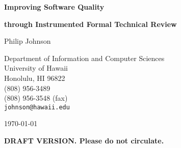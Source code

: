 \begin{titlepage}
\vspace*{1in}
\begin{center}
   
\Large

{\bf Improving Software Quality}   \medskip\par
{\bf through Instrumented Formal Technical Review}  \bigskip\par
                                                    \bigskip\par

\normalsize

Philip Johnson                           \medskip\par
Department of Information and Computer Sciences\\ 
University of Hawaii\\ 
Honolulu, HI 96822\\                       
(808) 956-3489\\
(808) 956-3548 (fax)\\
{\tt johnson@hawaii.edu}                 \bigskip\par

\today                                   \bigskip\par

{\bf DRAFT VERSION. Please do not circulate.}


\end{center}
\end{titlepage}
